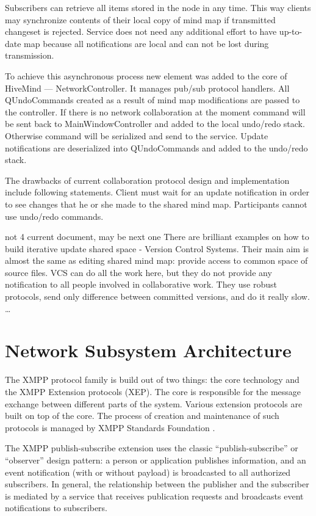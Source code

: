  Subscribers can retrieve all items stored in the node in any time. This
 way clients may synchronize contents of their local copy of mind map if
 transmitted changeset is rejected. Service does not need any additional effort
 to have up-to-date map because all notifications are local and can not be lost
 during transmission.

 To achieve this asynchronous process new element was added to the core of
 HiveMind --- NetworkController. It manages pub/sub protocol handlers. All
 QUndoCommands created as a result of mind map modifications are passed to the
 controller. If there is no network collaboration at the moment command will be
 sent back to MainWindowController and added to the local undo/redo stack.
 Otherwise command will be serialized and send to the service. Update
 notifications are deserialized into QUndoCommands and added to the undo/redo
 stack.

 The drawbacks of current collaboration protocol design and implementation
 include following statements. Client must wait for an update notification in
 order to see changes that he or she made to the shared mind map. Participants
 cannot use undo/redo commands.

 not 4 current document, may be next one
 There are brilliant examples on how to build iterative update shared space -
 Version Control Systems. Their main aim is almost the same as editing shared
 mind map: provide access to common space of source files. VCS can do all the 
 work here, but they do not provide any notification to all people involved in
 collaborative work. They use robust protocols, send only difference between
 committed versions, and do it really slow. \ldots

\section{Network Subsystem Architecture}

The XMPP protocol family is build out of two things: the core technology and the
XMPP Extension protocols (XEP). The core is responsible for the message exchange
between different parts of the system. Various extension protocols are built on
top of the core. The process of creation and maintenance of such protocols is
managed by XMPP Standards Foundation \cite{xmpp-standarts}.

The XMPP publish-subscribe extension \cite{xep-0060} uses the classic
``publish-subscribe'' or ``observer'' design pattern: a person or application
publishes information, and an event notification (with or without payload) is
broadcasted to all authorized subscribers. In general, the relationship between
the publisher and the subscriber is mediated by a service that receives
publication requests and broadcasts event notifications to subscribers.


